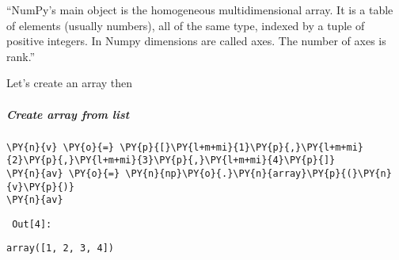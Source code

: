     ``NumPy's main object is the homogeneous multidimensional array. It is a
table of elements (usually numbers), all of the same type, indexed by a
tuple of positive integers. In Numpy dimensions are called axes. The
number of axes is rank.''

Let's create an array then


    \subparagraph{Create array from list}



{\par%
\vspace{-1\baselineskip}%
}%
\begin{notebookcell}[4]%
\begin{addmargin}[\cellleftmargin]{0em}%
{\smaller%
\par%
%
\vspace{-1\smallerfontscale}%
\begin{Verbatim}[commandchars=\\\{\}]
\PY{n}{v} \PY{o}{=} \PY{p}{[}\PY{l+m+mi}{1}\PY{p}{,}\PY{l+m+mi}{2}\PY{p}{,}\PY{l+m+mi}{3}\PY{p}{,}\PY{l+m+mi}{4}\PY{p}{]}
\PY{n}{av} \PY{o}{=} \PY{n}{np}\PY{o}{.}\PY{n}{array}\PY{p}{(}\PY{n}{v}\PY{p}{)}
\PY{n}{av}
\end{Verbatim}
%
\par%
\vspace{-1\smallerfontscale}}%
\end{addmargin}
\end{notebookcell}

\par\vspace{1\smallerfontscale}%
    
        {\par%
        \vspace{-1\smallerfontscale}%
        \noindent%
        \begin{minipage}{\cellleftmargin}%
    \hfill%
    {\smaller%
    \tt%
    \color{nbframe-out-prompt}%
    Out[4]:}%
    \hspace{\inputpadding}%
    \hspace{0em}%
    \hspace{3pt}%
    \end{minipage}%
        }%
    \begin{addmargin}[\cellleftmargin]{0em}%
    {\smaller%
    \vspace{-1\smallerfontscale}%
    
    
    
    \begin{verbatim}
array([1, 2, 3, 4])
    \end{verbatim}

    
}%
    \end{addmargin}%

